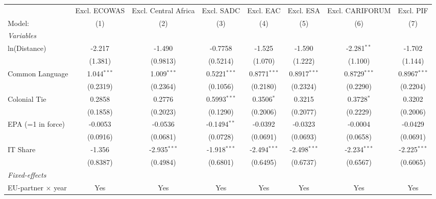 
\begingroup
\centering
\begin{tabular}{lccccccc}
   \tabularnewline \midrule \midrule
                             & Excl. ECOWAS  & Excl. Central Africa & Excl. SADC     & Excl. EAC      & Excl. ESA      & Excl. CARIFORUM & Excl. PIF \\   
   Model:                    & (1)           & (2)                  & (3)            & (4)            & (5)            & (6)             & (7)\\  
   \midrule
   \emph{Variables}\\
   ln(Distance)              & -2.217        & -1.490               & -0.7758        & -1.525         & -1.590         & -2.281$^{**}$   & -1.702\\   
                             & (1.381)       & (0.9813)             & (0.5214)       & (1.070)        & (1.222)        & (1.100)         & (1.144)\\   
   Common Language           & 1.044$^{***}$ & 1.009$^{***}$        & 0.5221$^{***}$ & 0.8771$^{***}$ & 0.8917$^{***}$ & 0.8729$^{***}$  & 0.8967$^{***}$\\   
                             & (0.2319)      & (0.2364)             & (0.1056)       & (0.2180)       & (0.2324)       & (0.2290)        & (0.2204)\\   
   Colonial Tie              & 0.2858        & 0.2776               & 0.5993$^{***}$ & 0.3506$^{*}$   & 0.3215         & 0.3728$^{*}$    & 0.3202\\   
                             & (0.1858)      & (0.2023)             & (0.1290)       & (0.2006)       & (0.2077)       & (0.2229)        & (0.2006)\\   
   EPA (=1 in force)         & -0.0053       & -0.0536              & -0.1494$^{**}$ & -0.0392        & -0.0323        & -0.0004         & -0.0429\\   
                             & (0.0916)      & (0.0681)             & (0.0728)       & (0.0691)       & (0.0693)       & (0.0658)        & (0.0691)\\   
   IT Share                  & -1.356        & -2.935$^{***}$       & -1.918$^{***}$ & -2.494$^{***}$ & -2.498$^{***}$ & -2.234$^{***}$  & -2.225$^{***}$\\   
                             & (0.8387)      & (0.4984)             & (0.6801)       & (0.6495)       & (0.6737)       & (0.6567)        & (0.6065)\\   
   \midrule
   \emph{Fixed-effects}\\
   EU-partner $\times$ year  & Yes           & Yes                  & Yes            & Yes            & Yes            & Yes             & Yes\\  

\end{tabular}

